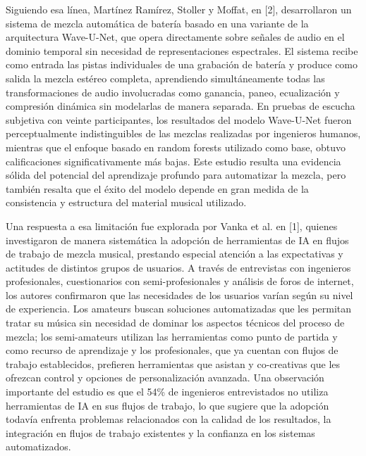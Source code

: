 Siguiendo esa línea, Martínez Ramírez, Stoller y Moffat, en [2], desarrollaron un sistema de mezcla automática de batería basado en una variante de la arquitectura Wave-U-Net, que opera directamente sobre señales de audio en el dominio temporal sin necesidad de representaciones espectrales. El sistema recibe como entrada las pistas individuales de una grabación de batería y produce como salida la mezcla estéreo completa, aprendiendo simultáneamente todas las transformaciones de audio involucradas como ganancia, paneo, ecualización y compresión dinámica sin modelarlas de manera separada. En pruebas de escucha subjetiva con veinte participantes, los resultados del modelo Wave-U-Net fueron perceptualmente indistinguibles de las mezclas realizadas por ingenieros humanos, mientras que el enfoque basado en random forests utilizado como base, obtuvo calificaciones significativamente más bajas. Este estudio resulta una evidencia sólida del potencial del aprendizaje profundo para automatizar la mezcla, pero también resalta que el éxito del modelo depende en gran medida de la consistencia y estructura del material musical utilizado.

Una respuesta a esa limitación fue explorada por Vanka et al. en [1], quienes investigaron de manera sistemática la adopción de herramientas de IA en flujos de trabajo de mezcla musical, prestando especial atención a las expectativas y actitudes de distintos grupos de usuarios. A través de entrevistas con ingenieros profesionales, cuestionarios con semi-profesionales y análisis de foros de internet, los autores confirmaron que las necesidades de los usuarios varían según su nivel de experiencia. Los amateurs buscan soluciones automatizadas que les permitan tratar su música sin necesidad de dominar los aspectos técnicos del proceso de mezcla; los semi-amateurs utilizan las herramientas como punto de partida y como recurso de aprendizaje y los profesionales, que ya cuentan con flujos de trabajo establecidos, prefieren herramientas que asistan y co-creativas que les ofrezcan control y opciones de personalización avanzada. Una observación importante del estudio es que el 54\% de ingenieros entrevistados no utiliza herramientas de IA en sus flujos de trabajo, lo que sugiere que la adopción todavía enfrenta problemas relacionados con la calidad de los resultados, la integración en flujos de trabajo existentes y la confianza en los sistemas automatizados.

